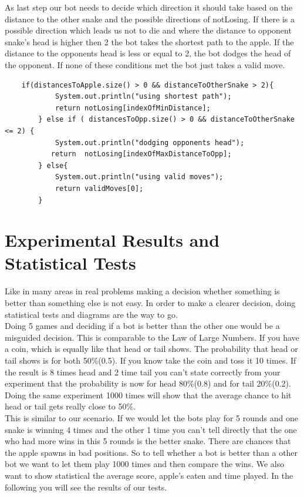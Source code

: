 \documentclass[a4paper,12pt]{article}
\begin{document}
As last step our bot needs to decide which direction it should take based on the distance to the other snake and the possible directions of notLosing. If there is a possible direction which leads us not to die and where the distance to opponent snake's head is higher then 2 the bot takes the shortest path to the apple. If the distance to the opponents head is less or equal to 2, the bot dodges the head of the opponent. If none of these conditions met the bot just takes a valid move.
\begin{verbatim}
	if(distancesToApple.size() > 0 && distanceToOtherSnake > 2){
            System.out.println("using shortest path");
            return notLosing[indexOfMinDistance];
        } else if ( distancesToOpp.size() > 0 && distanceToOtherSnake <= 2) {
            System.out.println("dodging opponents head");
           return  notLosing[indexOfMaxDistanceToOpp];
        } else{
            System.out.println("using valid moves");
            return validMoves[0];
        }
\end{verbatim}
\section{Experimental Results and Statistical Tests}
Like in many areas in real problems making a decision whether something is better than something else is not easy. In order to make a clearer decision, doing statistical tests and diagrams are the way to go.\\
Doing 5 games and deciding if a bot is better than the other one would be a misguided decision. This is comparable to the Law of Large Numbers. If you have a coin, which is equally like that head or tail shows. The probability that head or tail shows is for both 50\%(0.5). If you know take the coin and toss it 10 times. If the result is 8 times head and 2 time tail you can't state correctly from your experiment that the probability is now for head 80\%(0.8) and for tail 20\%(0.2). Doing the same experiment 1000 times will show that the average chance to hit head or tail gets really close to 50\%.\\
This is similar to our scenario. If we would let the bots play for 5 rounds and one snake is winning 4 times and the other 1 time you can't tell directly that the one who had more wins in this 5 rounds is the better snake. There are chances that the apple spawns in bad positions. So to tell whether a bot is better than a other bot we want to let them play 1000 times and then compare the wins. We also want to show statistical the average score, apple's eaten and time played. In the following you will see the results of our tests.
\newpage
\end{document}
